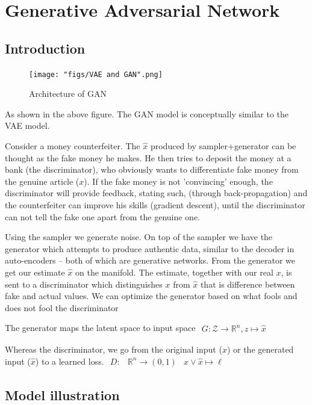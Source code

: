 \section{Generative Adversarial Network}
\subsection{Introduction}
\begin{figure}
    \centering
    \texttt{[image: "figs/VAE and GAN".png]}
    \caption{Architecture of GAN}
    \label{fig:gan_arch}
\end{figure}

As shown in the above figure. The GAN model is conceptually similar to the VAE model.

Consider a money counterfeiter. The $\hat{x}$ produced by sampler+generator can be thought as the fake money he makes. He then tries to deposit the money at a bank (the discriminator), who obviously wants to differentiate fake money from the genuine article ($x$). If the fake money is not 'convincing' enough, the discriminator will provide feedback, stating such, (through back-propagation) and the counterfeiter can improve his skills (gradient descent), until the discriminator can not tell the fake one apart from the genuine one.

Using the sampler we generate noise. On top of the sampler we have the generator which attempts to produce authentic data, similar to the decoder in auto-encoders -- both of which are generative networks. From the generator we get our estimate $\hat{x}$ on the manifold. The estimate, together with our real $x$, is sent to a discriminator which distinguishes $x$ from $\hat{x}$ that is difference between fake and actual values. We can optimize the generator based on what fools and does not fool the discriminator

The generator maps the latent space to input space $\begin{array}{r}{G : \mathcal{Z} \rightarrow \mathbb{R}^{n}}, {z \mapsto \hat{x}}\end{array}$

Whereas the discriminator, we go from the original input ($x$) or the generated input ($\hat{x}$) to a learned loss. $\begin{aligned} D : & \mathbb{R}^{n} \rightarrow(0,1) & x \vee \hat{x} \mapsto \ell \end{aligned}$

\subsection{Model illustration}

